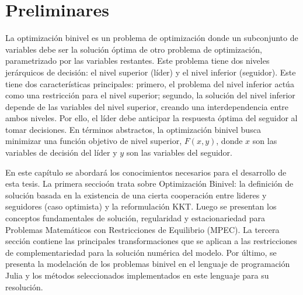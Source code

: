 \chapter{Preliminares}\label{chapter:state-of-the-art}

La optimización binivel es un problema de optimización donde un subconjunto de variables debe ser la solución óptima de otro problema de optimización, parametrizado por las variables restantes. Este problema tiene dos niveles jerárquicos de decisión: el nivel superior (líder) y el nivel inferior (seguidor).
Este tiene dos características principales: primero, el problema del nivel inferior actúa como una restricción para el nivel superior; segundo, la solución del nivel inferior depende de las variables del nivel superior, creando una interdependencia entre ambos niveles. Por ello, el líder debe anticipar la respuesta óptima del seguidor al tomar decisiones.
En términos abstractos, la optimización binivel busca minimizar una función objetivo de nivel superior, $F(x, y)$, donde $x$ son las variables de decisión del líder y $y$ son las variables del seguidor. 

En este capítulo se abordará los conocimientos necesarios para el desarrollo de esta tesis. La primera seccio\'on trata  sobre Optimización Binivel: la definición de solución basada en la existencia de una cierta cooperación entre lideres y seguidores (caso  optimista) y la reformulación KKT. Luego se presentan los conceptos fundamentales  de solución, regularidad y estacionariedad para Problemas Matemáticos con Restricciones de Equilibrio (MPEC). La tercera sección contiene las principales transformaciones que se aplican a las restricciones de complementariedad para la solución num\'erica del modelo. Por último, se presenta la modelación de los problemas binivel en el lenguaje de programación Julia y los métodos seleccionados implementados en este lenguaje para su resolución. 

